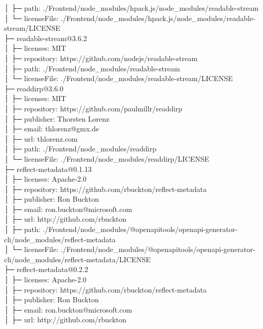 \documentclass[
    paper=a4,
    twoside=false,
    parskip=half,
    listof=entryprefix,
    listof=totoc,
    index=totoc,
    bibliography=totoc,
    headsepline,
]{scrbook}
\begin{document}
    │  ├─ path: ./Frontend/node\_modules/hpack.js/node\_modules/readable-stream\\
    │  └─ licenseFile: ./Frontend/node\_modules/hpack.js/node\_modules/readable-stream/LICENSE\\
    ├─ readable-stream@3.6.2\\
    │  ├─ licenses: MIT\\
    │  ├─ repository: https://github.com/nodejs/readable-stream\\
    │  ├─ path: ./Frontend/node\_modules/readable-stream\\
    │  └─ licenseFile: ./Frontend/node\_modules/readable-stream/LICENSE\\
    ├─ readdirp@3.6.0\\
    │  ├─ licenses: MIT\\
    │  ├─ repository: https://github.com/paulmillr/readdirp\\
    │  ├─ publisher: Thorsten Lorenz\\
    │  ├─ email: thlorenz@gmx.de\\
    │  ├─ url: thlorenz.com\\
    │  ├─ path: ./Frontend/node\_modules/readdirp\\
    │  └─ licenseFile: ./Frontend/node\_modules/readdirp/LICENSE\\
    ├─ reflect-metadata@0.1.13\\
    │  ├─ licenses: Apache-2.0\\
    │  ├─ repository: https://github.com/rbuckton/reflect-metadata\\
    │  ├─ publisher: Ron Buckton\\
    │  ├─ email: ron.buckton@microsoft.com\\
    │  ├─ url: http://github.com/rbuckton\\
    │  ├─ path: ./Frontend/node\_modules/@openapitools/openapi-generator-cli/node\_modules/reflect-metadata\\
    │  └─ licenseFile: ./Frontend/node\_modules/@openapitools/openapi-generator-cli/node\_modules/reflect-metadata/LICENSE\\
    ├─ reflect-metadata@0.2.2\\
    │  ├─ licenses: Apache-2.0\\
    │  ├─ repository: https://github.com/rbuckton/reflect-metadata\\
    │  ├─ publisher: Ron Buckton\\
    │  ├─ email: ron.buckton@microsoft.com\\
    │  ├─ url: http://github.com/rbuckton\\
\end{document}
